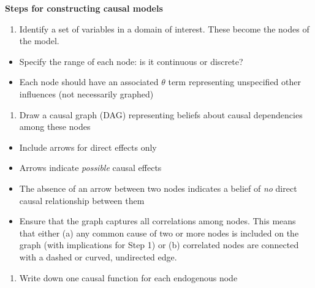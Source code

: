 \documentclass[
  12pt,
]{book}
\providecommand{\tightlist}{%
  \setlength{\itemsep}{0pt}\setlength{\parskip}{0pt}}
\newenvironment{headerbox}{
  \definecolor{shadecolor}{rgb}{0.8, 0.8, 0.8}  %
  \color{black}
  \begin{shaded}}{\end{shaded}}
\begin{document}
\begin{headerbox}

\begin{center}
\textbf{Steps for constructing causal models}

\end{center}

\begin{enumerate}
\def\labelenumi{\arabic{enumi}.}
\tightlist
\item
  Identify a set of variables in a domain of interest. These become the nodes of the model.
\end{enumerate}

\begin{itemize}
\tightlist
\item
  Specify the range of each node: is it continuous or discrete?
\item
  Each node should have an associated \(\theta\) term representing unspecified other influences (not necessarily graphed)
\end{itemize}

\begin{enumerate}
\def\labelenumi{\arabic{enumi}.}
\setcounter{enumi}{1}
\tightlist
\item
  Draw a causal graph (DAG) representing beliefs about causal dependencies among these nodes
\end{enumerate}

\begin{itemize}
\tightlist
\item
  Include arrows for direct effects only
\item
  Arrows indicate \emph{possible} causal effects
\item
  The absence of an arrow between two nodes indicates a belief of \emph{no} direct causal relationship between them
\item
  Ensure that the graph captures all correlations among nodes. This means that either (a) any common cause of two or more nodes is included on the graph (with implications for Step 1) or (b) correlated nodes are connected with a dashed or curved, undirected edge.
\end{itemize}

\begin{enumerate}
\def\labelenumi{\arabic{enumi}.}
\setcounter{enumi}{2}
\tightlist
\item
  Write down one causal function for each endogenous node
\end{enumerate}


\end{headerbox}
\end{document}
